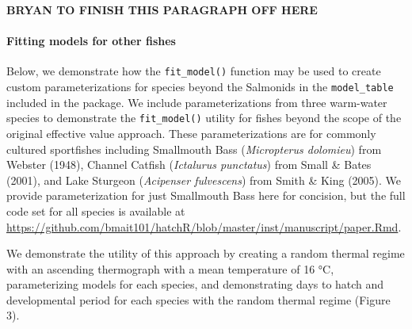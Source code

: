 \documentclass[10pt,a4paper,onecolumn]{article}
\let\oldparagraph\paragraph
\renewcommand{\paragraph}[1]{\oldparagraph{#1}\mbox{}}
\begin{document}
\textbf{BRYAN TO FINISH THIS PARAGRAPH OFF HERE}

\paragraph{Fitting models for other
fishes}\label{fitting-models-for-other-fishes}

Below, we demonstrate how the \texttt{fit\_model()} function may be used
to create custom parameterizations for species beyond the Salmonids in
the \texttt{model\_table} included in the package. We include
parameterizations from three warm-water species to demonstrate the
\texttt{fit\_model()} utility for fishes beyond the scope of the
original effective value approach. These parameterizations are for
commonly cultured sportfishes including Smallmouth Bass
(\emph{Micropterus dolomieu}) from Webster (1948), Channel Catfish
(\emph{Ictalurus punctatus}) from Small \& Bates (2001), and Lake
Sturgeon (\emph{Acipenser fulvescens}) from Smith \& King (2005). We
provide parameterization for just Smallmouth Bass here for concision,
but the full code set for all species is available at
\url{https://github.com/bmait101/hatchR/blob/master/inst/manuscript/paper.Rmd}.

We demonstrate the utility of this approach by creating a random thermal
regime with an ascending thermograph with a mean temperature of 16 °C,
parameterizing models for each species, and demonstrating days to hatch
and developmental period for each species with the random thermal regime
(Figure 3).
\end{document}
